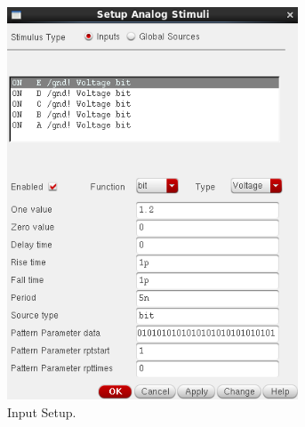 \documentclass[11pt]{article}
\begin{document}
\begin{figure}[!h]
    \begin{subfigure}[h]{0.5\textwidth}
        \centering
        \includegraphics[width=0.95\textwidth]{e.png}
        \caption{Input Setup.}
    \end{subfigure}
    \begin{subfigure}[h]{0.5\textwidth}
        \centering

\end{subfigure}
\end{figure}
\end{document}
